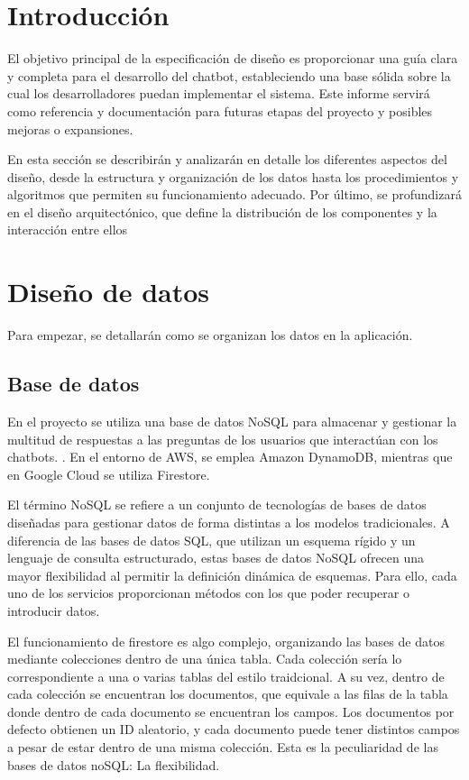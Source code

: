 
\section{Introducción}
El objetivo principal de la especificación de diseño es proporcionar una guía clara y completa para el desarrollo del chatbot, estableciendo una base sólida sobre la cual los desarrolladores puedan implementar el sistema. Este informe servirá como referencia y documentación para futuras etapas del proyecto y posibles mejoras o expansiones.

En esta sección se describirán y analizarán en detalle los diferentes aspectos del diseño, desde la estructura y organización de los datos hasta los procedimientos y algoritmos que permiten su funcionamiento adecuado. Por último, se profundizará en el diseño arquitectónico, que define la distribución de los componentes y la interacción entre ellos

\section{Diseño de datos}
Para empezar, se detallarán como se organizan los datos en la aplicación. 

\subsection{Base de datos}
En el proyecto se utiliza una base de datos NoSQL para almacenar y gestionar la multitud de respuestas a las preguntas de los usuarios que interactúan con los chatbots. . En el entorno de AWS, se emplea Amazon DynamoDB, mientras que en Google Cloud se utiliza Firestore.

El término NoSQL se refiere a un conjunto de tecnologías de bases de datos diseñadas para gestionar datos de forma distintas a los modelos tradicionales. A diferencia de las bases de datos SQL, que utilizan un esquema rígido y un lenguaje de consulta estructurado, estas bases de datos NoSQL ofrecen una mayor flexibilidad al permitir la definición dinámica de esquemas. Para ello, cada uno de los servicios proporcionan métodos con los que poder recuperar o introducir datos.

El funcionamiento de firestore es algo complejo, organizando las bases de datos mediante colecciones dentro de una única tabla. Cada colección sería lo correspondiente a una o varias tablas del estilo traidcional. A su vez, dentro de cada colección se encuentran los documentos, que equivale a las filas de la tabla donde dentro de cada documento se encuentran los campos. Los documentos por defecto obtienen un ID aleatorio, y cada documento puede tener distintos campos a pesar de estar dentro de una misma colección. Esta es la peculiaridad de las bases de datos noSQL: La flexibilidad.

